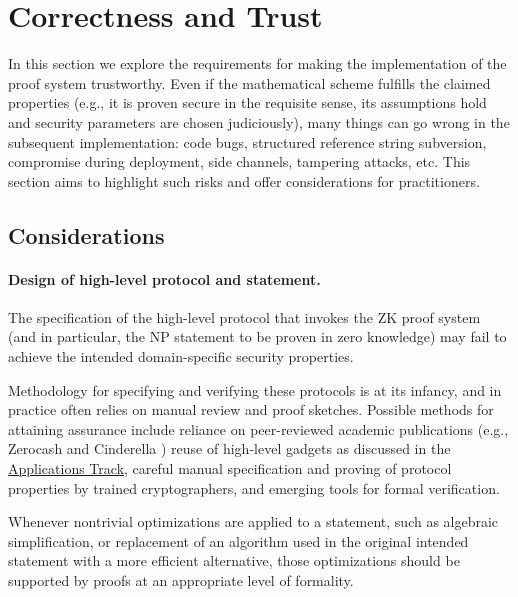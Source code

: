 \section{Correctness and Trust}
\label{implem:correctness}

In this section we explore the requirements for making the implementation of the proof system trustworthy. Even if the mathematical scheme fulfills the claimed properties (e.g., it is proven secure in the requisite sense, its assumptions hold and security parameters are chosen judiciously), many things can go wrong in the subsequent implementation: code bugs, structured reference string subversion, compromise during deployment, side channels, tampering attacks, etc. This section aims to highlight such risks and offer considerations for practitioners.


\subsection{Considerations}
\label{implem:correctness:considerations}


\paragraph{Design of high-level protocol and statement.}

The specification of the high-level protocol that invokes the ZK proof system (and in particular, the NP statement to be proven in zero knowledge) may fail to achieve the intended domain-specific security properties.

Methodology for specifying and verifying these protocols is at its infancy, and in practice often relies on manual review and proof sketches. 
Possible methods for attaining assurance include reliance on peer-reviewed academic publications 
(e.g., Zerocash \cite{2014:SP:Zerocash} %
and Cinderella \cite{2016:SP:cinderella}) %
reuse of high-level gadgets as discussed in the \hyperref[chap:apps]{Applications Track}, careful manual specification and proving of protocol properties by trained cryptographers, and emerging tools for formal verification.

Whenever nontrivial optimizations are applied to a statement, such as algebraic simplification, or replacement of an algorithm used in the original intended statement with a more efficient alternative, those optimizations should be supported by proofs at an appropriate level of formality.


